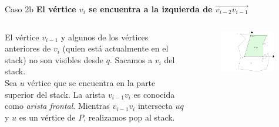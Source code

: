 \documentclass[aspectratio=169,xcolor=dvipsnames, t]{beamer}
\begin{document}
\begin{frame}{Caso 2b}
    \textbf{El vértice $v_{i}$ se encuentra a la izquierda de $\overrightarrow{v_{i-2}v_{i-1}}$}\\
    \vspace{0.5cm}
    \begin{columns}
    \begin{column}{0.45\textwidth}
    \small
        El vértice $v_{i-1}$ y algunos de los vértices anteriores de $v_{i}$ (quien está actualmente en el stack) no son visibles desde $q$. Sacamos a $v_{i}$ del stack. \\
        \vspace{0.5cm}
        Sea $u$ vértice que se encuentra en la parte superior del stack. La arista $v_{i-1}v_{i}$ es conocida como \textit{arista frontal}. Mientras $v_{i-1}v_{i}$ intersecta $uq$ y $u$ es un vértice de $P$, realizamos pop al stack.\\
    \end{column}
    \begin{column}{0.45\textwidth}  %
    \vspace{-1.5cm}
        \begin{figure}
            \centering
            \includegraphics[width=0.95\textwidth]{imagenes/Caso2.4a.png}
        \end{figure}
    \end{column}
    \end{columns}
\end{frame}

\end{document}
